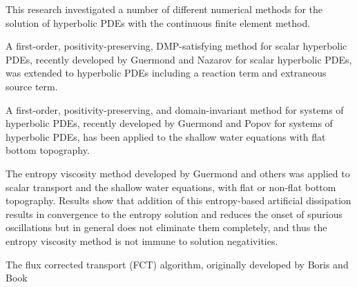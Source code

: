 This research investigated a number of different numerical methods for
the solution of hyperbolic PDEs with the continuous finite element
method.

A first-order, positivity-preserving, DMP-satisfying method
for scalar hyperbolic PDEs, recently developed by Guermond and Nazarov
\cite{guermond_firstorder} for scalar hyperbolic PDEs, was extended
to hyperbolic PDEs including a reaction term and extraneous source term.

A first-order, positivity-preserving, and domain-invariant method for systems
of hyperbolic PDEs, recently developed by Guermond and Popov
\cite{guermond_invariantdomain} for systems of hyperbolic PDEs,
has been applied to the shallow water equations with flat bottom topography.

The entropy viscosity method developed by Guermond and others \cite{guermond_ev}
was applied to scalar transport and the shallow water equations, with flat
or non-flat bottom topography. Results show that addition of this entropy-based
artificial dissipation results in convergence to the entropy solution
and reduces the onset of spurious oscillations but in general does not eliminate
them completely, and thus the entropy viscosity method is not immune to
solution negativities.

The flux corrected transport (FCT) algorithm, originally developed by Boris
and Book \cite{borisbook}

